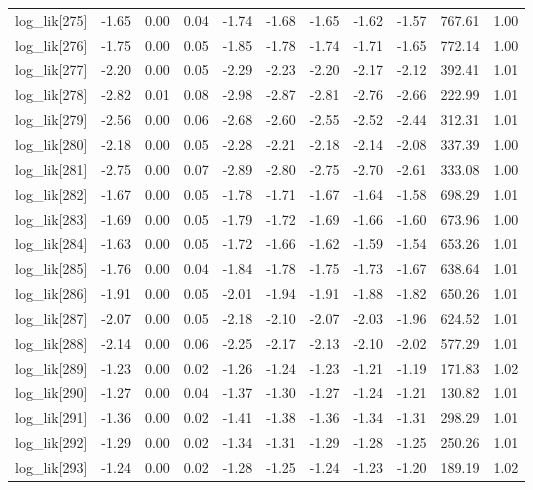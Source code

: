 \begin{table}[ht]
\begin{tabular}{rrrrrrrrrrr}
  log\_lik[275] & -1.65 & 0.00 & 0.04 & -1.74 & -1.68 & -1.65 & -1.62 & -1.57 & 767.61 & 1.00 \\ 
  log\_lik[276] & -1.75 & 0.00 & 0.05 & -1.85 & -1.78 & -1.74 & -1.71 & -1.65 & 772.14 & 1.00 \\ 
  log\_lik[277] & -2.20 & 0.00 & 0.05 & -2.29 & -2.23 & -2.20 & -2.17 & -2.12 & 392.41 & 1.01 \\ 
  log\_lik[278] & -2.82 & 0.01 & 0.08 & -2.98 & -2.87 & -2.81 & -2.76 & -2.66 & 222.99 & 1.01 \\ 
  log\_lik[279] & -2.56 & 0.00 & 0.06 & -2.68 & -2.60 & -2.55 & -2.52 & -2.44 & 312.31 & 1.01 \\ 
  log\_lik[280] & -2.18 & 0.00 & 0.05 & -2.28 & -2.21 & -2.18 & -2.14 & -2.08 & 337.39 & 1.00 \\ 
  log\_lik[281] & -2.75 & 0.00 & 0.07 & -2.89 & -2.80 & -2.75 & -2.70 & -2.61 & 333.08 & 1.00 \\ 
  log\_lik[282] & -1.67 & 0.00 & 0.05 & -1.78 & -1.71 & -1.67 & -1.64 & -1.58 & 698.29 & 1.01 \\ 
  log\_lik[283] & -1.69 & 0.00 & 0.05 & -1.79 & -1.72 & -1.69 & -1.66 & -1.60 & 673.96 & 1.00 \\ 
  log\_lik[284] & -1.63 & 0.00 & 0.05 & -1.72 & -1.66 & -1.62 & -1.59 & -1.54 & 653.26 & 1.01 \\ 
  log\_lik[285] & -1.76 & 0.00 & 0.04 & -1.84 & -1.78 & -1.75 & -1.73 & -1.67 & 638.64 & 1.01 \\ 
  log\_lik[286] & -1.91 & 0.00 & 0.05 & -2.01 & -1.94 & -1.91 & -1.88 & -1.82 & 650.26 & 1.01 \\ 
  log\_lik[287] & -2.07 & 0.00 & 0.05 & -2.18 & -2.10 & -2.07 & -2.03 & -1.96 & 624.52 & 1.01 \\ 
  log\_lik[288] & -2.14 & 0.00 & 0.06 & -2.25 & -2.17 & -2.13 & -2.10 & -2.02 & 577.29 & 1.01 \\ 
  log\_lik[289] & -1.23 & 0.00 & 0.02 & -1.26 & -1.24 & -1.23 & -1.21 & -1.19 & 171.83 & 1.02 \\ 
  log\_lik[290] & -1.27 & 0.00 & 0.04 & -1.37 & -1.30 & -1.27 & -1.24 & -1.21 & 130.82 & 1.01 \\ 
  log\_lik[291] & -1.36 & 0.00 & 0.02 & -1.41 & -1.38 & -1.36 & -1.34 & -1.31 & 298.29 & 1.01 \\ 
  log\_lik[292] & -1.29 & 0.00 & 0.02 & -1.34 & -1.31 & -1.29 & -1.28 & -1.25 & 250.26 & 1.01 \\ 
  log\_lik[293] & -1.24 & 0.00 & 0.02 & -1.28 & -1.25 & -1.24 & -1.23 & -1.20 & 189.19 & 1.02 \\ 

\end{tabular}
\end{table}
